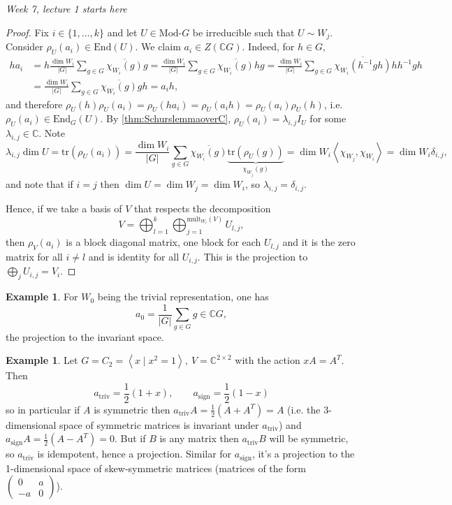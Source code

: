 \documentclass{article}
\newcommand{\mult}{\text{mult}}
\newcommand{\tr}{\text{tr}}
\newcommand{\la}{\left\langle}
\newcommand{\ra}{\right\rangle}
\newcommand{\C}{\mathbb{C}}
\newcommand{\End}{\text{End}}
\newcommand{\Mod}{\text{Mod-}}
\theoremstyle{definition}
\newtheorem{example}[defn]{Example}
\begin{document}
\begin{flushright}
\textit{Week 7, lecture 1 starts here}
\end{flushright}

\begin{proof}
Fix $i\in\{1,\ldots,k\}$ and let $U\in\Mod G$ be irreducible such that $U\sim W_j$. Consider $\rho_U(a_i)\in\End(U)$. We claim $a_i\in Z(\C G)$. Indeed, for $h\in G,$
\[
\begin{aligned}
ha_i&=h\frac{\dim W_i}{|G|}\sum_{g\in G}\overline{\chi_{W_i}(g)}g=\frac{\dim W_i}{|G|}\sum_{g\in G}\overline{\chi_{W_i}(g)}hg=\frac{\dim W_i}{|G|}\sum_{g\in G}\overline{\chi_{W_i}(h^{-1}gh)}hh^{-1}gh\\
&=\frac{\dim W_i}{|G|}\sum_{g\in G}\overline{\chi_{W_i}(g)}gh=a_ih,
\end{aligned}
\]
and therefore $\rho_U(h)\rho_U(a_i)=\rho_U(ha_i)=\rho_U(a_ih)=\rho_U(a_i)\rho_U(h)$, i.e. $\rho_U(a_i)\in\End_G(U)$. By \ref{thm:SchurslemmaoverC}, $\rho_U(a_i)=\lambda_{i,j}I_U$ for some $\lambda_{i,j}\in\C$. Note
\[
\lambda_{i,j}\dim U=\tr(\rho_U(a_i))=\frac{\dim W_i}{|G|}\sum_{g\in G}\overline{\chi_{W_i}(g)}\underbrace{\tr(\rho_U(g))}_{\chi_{W_j}(g)}=\dim W_i\la \chi_{W_j},\chi_{W_i}\ra=\dim W_i\delta_{i,j},
\]
and note that if $i=j$ then $\dim U=\dim W_j=\dim W_i$, so $\lambda_{i,j}=\delta_{i,j}$.

Hence, if we take a basis of $V$ that respects the decomposition
\[
V=\bigoplus_{l=1}^k\bigoplus_{j=1}^{\mult_{W_l}(V)} U_{l,j},
\]
then $\rho_V(a_i)$ is a block diagonal matrix, one block for each $U_{l,j}$ and it is the zero matrix for all $i\neq l$ and is identity for all $U_{i,j}$. This is the projection to $\bigoplus_j U_{i,j}=V_i$.
\end{proof}

\begin{example}
For $W_0$ being the trivial representation, one has
\[
a_0=\frac{1}{|G|}\sum_{g\in G}g\in\C G,
\]
the projection to the invariant space.
\end{example}
\begin{example}
Let $G=C_2=\la x\mid x^2=1\ra,\ V=\C^{2\times 2}$ with the action $xA=A^T$. Then
\[
a_{\text{triv}}=\frac12(1+x),\qquad a_{\text{sign}}=\frac12(1-x)
\]
so in particular if $A$ is symmetric then $a_{\text{triv}}A=\frac12\left(A+A^T\right)=A$ (i.e. the 3-dimensional space of symmetric matrices is invariant under $a_\text{triv}$) and $a_{\text{sign}}A=\frac12\left(A-A^T\right)=0$. But if $B$ is any matrix then $a_{\text{triv}}B$ will be symmetric, so $a_{\text{triv}}$ is idempotent, hence a projection. Similar for $a_\text{sign}$, it's a projection to the 1-dimensional space of skew-symmetric matrices (matrices of the form $\begin{pmatrix}0&a\\-a&0\end{pmatrix}$).
\end{example}
\end{document}
